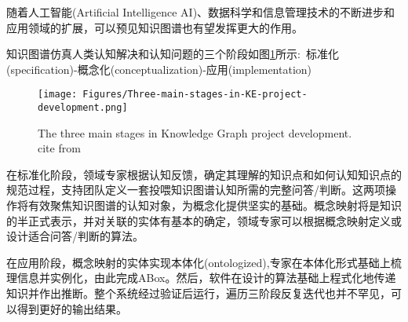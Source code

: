 随着人工智能\textrm{(Artificial Intelligence AI)}、数据科学和信息管理技术的不断进步和应用领域的扩展，可以预见知识图谱也有望发挥更大的作用。%

知识图谱仿真人类认知解决和认知问题的三个阶段如图\ref{Fig:Three-main-stages-in-KE-pro-dev}所示:~标准化\textrm{(specification)}-概念化\textrm{(conceptualization)}-应用\textrm{(implementation)}
\begin{figure}[h!]
\centering
\texttt{[image: Figures/Three-main-stages-in-KE-project-development.png]}
\caption{\small\textrm{The three main stages in Knowledge Graph project development. cite from~\cite{ACR56-128_2023}}}%
\label{Fig:Three-main-stages-in-KE-pro-dev}
\end{figure}
在标准化阶段，领域专家根据认知反馈，确定其理解的知识点和如何认知知识点的规范过程，支持团队定义一套投喂知识图谱认知所需的完整问答/判断。这两项操作将有效聚焦知识图谱的认知对象，为概念化提供坚实的基础。概念映射将是知识的半正式表示，并对关联的实体有基本的确定，领域专家可以根据概念映射定义或设计适合问答/判断的算法。

在应用阶段，概念映射的实体实现本体化\textrm{(ontologized)},专家在本体化形式基础上梳理信息并实例化，由此完成\textrm{ABox}。然后，软件在设计的算法基础上程式化地传递知识并作出推断。整个系统经过验证后运行，遍历三阶段反复迭代也并不罕见，可以得到更好的输出结果。

